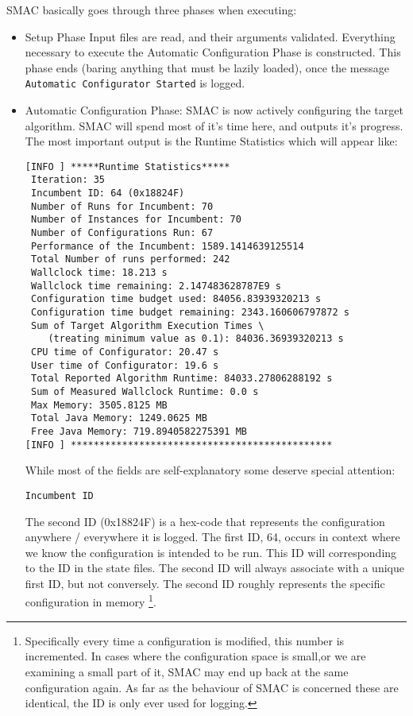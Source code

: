 \documentclass[manual.tex]{subfiles}
\begin{document}
SMAC basically goes through three phases when executing:
\begin{itemize}
\item Setup Phase Input files are read, and their arguments validated. Everything necessary to execute the Automatic Configuration Phase is constructed. This phase ends (baring anything that must be lazily loaded), once the message \texttt{Automatic Configurator Started} is logged.

\item Automatic Configuration Phase: SMAC is now actively configuring the target algorithm. SMAC will spend most of it's time here, and outputs it's progress. The most important output is the Runtime Statistics which will appear like:
\scriptsize{
\begin{verbatim}
[INFO ] *****Runtime Statistics*****
 Iteration: 35
 Incumbent ID: 64 (0x18824F)
 Number of Runs for Incumbent: 70
 Number of Instances for Incumbent: 70
 Number of Configurations Run: 67
 Performance of the Incumbent: 1589.1414639125514
 Total Number of runs performed: 242
 Wallclock time: 18.213 s
 Wallclock time remaining: 2.147483628787E9 s
 Configuration time budget used: 84056.83939320213 s
 Configuration time budget remaining: 2343.160606797872 s
 Sum of Target Algorithm Execution Times \
 	(treating minimum value as 0.1): 84036.36939320213 s
 CPU time of Configurator: 20.47 s
 User time of Configurator: 19.6 s
 Total Reported Algorithm Runtime: 84033.27806288192 s
 Sum of Measured Wallclock Runtime: 0.0 s
 Max Memory: 3505.8125 MB
 Total Java Memory: 1249.0625 MB
 Free Java Memory: 719.8940582275391 MB
[INFO ] **********************************************
\end{verbatim}
}

\normalsize
While most of the fields are self-explanatory some deserve special attention:


\texttt{Incumbent ID}

The second ID (0x18824F) is a hex-code that represents the configuration anywhere / everywhere it is logged. The first ID, 64, occurs in context where we know the configuration is intended to be run. This ID will corresponding to the ID in the state files. The second ID will always associate with a unique first ID, but not conversely. The second ID roughly represents the specific configuration in memory \footnote{Specifically every time a configuration is modified, this number is incremented. In cases where the configuration space is small,or we are examining a small part of it, SMAC may end up back at the same configuration again. As far as the behaviour of SMAC is concerned these are identical, the ID is only ever used for logging.}.


\end{itemize}
\end{document}
